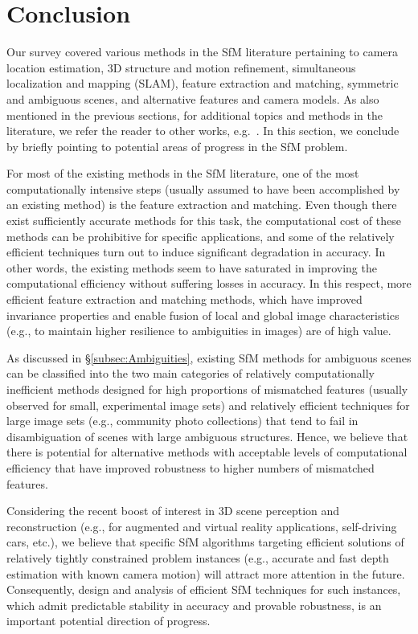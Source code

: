\documentclass[10pt]{article}
\begin{document}
\section{Conclusion}
\label{sec:Conclusion}
Our survey covered various methods in the SfM literature pertaining to camera location estimation, $3$D structure and motion refinement, simultaneous localization and mapping (SLAM), feature extraction and matching, symmetric and ambiguous scenes, and alternative features and camera models. As also mentioned in the previous sections, for additional topics and methods in the literature, we refer the reader to other works, e.g.~\cite{HartleyBook,BundleAdjustment,OliensisCritique,EpipolarReview,TronSurvey,KanadeFactorization,Urban3DSurvey,GLOH,DescSurvey2}. In this section, we conclude by briefly pointing to potential areas of progress in the SfM problem.

For most of the existing methods in the SfM literature, one of the most computationally intensive steps (usually assumed to have been accomplished by an existing method) is the feature extraction and matching. Even though there exist sufficiently accurate methods for this task, the computational cost of these methods can be prohibitive for specific applications, and some of the relatively efficient techniques turn out to induce significant degradation in accuracy. In other words, the existing methods seem to have saturated in improving the computational efficiency without suffering losses in accuracy. In this respect, more efficient feature extraction and matching methods, which have improved invariance properties and enable fusion of local and global image characteristics (e.g., to maintain higher resilience to ambiguities in images) are of high value.

As discussed in \S\ref{subsec:Ambiguities}, existing SfM methods for ambiguous scenes can be classified into the two main categories of relatively computationally inefficient methods designed for high proportions of mismatched features (usually observed for small, experimental image sets) and relatively efficient techniques for large image sets (e.g., community photo collections) that tend to fail in disambiguation of scenes with large ambiguous structures. Hence, we believe that there is potential for alternative methods with acceptable levels of computational efficiency that have improved robustness to higher numbers of mismatched features. 

Considering the recent boost of interest in $3$D scene perception and reconstruction (e.g., for augmented and virtual reality applications, self-driving cars, etc.), we believe that specific SfM algorithms targeting efficient solutions of relatively tightly constrained problem instances (e.g., accurate and fast depth estimation with known camera motion) will attract more attention in the future. Consequently, design and analysis of efficient SfM techniques for such instances, which admit predictable stability in accuracy and provable robustness, is an important potential direction of progress. 
\end{document}
